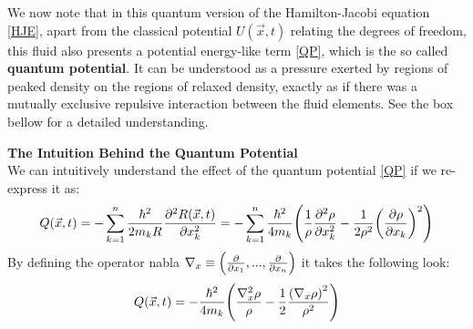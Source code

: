 \documentclass[11pt, a4paper]{article} %
\DeclareRobustCommand{\mybox}[2][gray!10]{%
\begin{tcolorbox}[   %
        left=0.2cm,
        right=0.2cm,
        top=0.15cm,
        bottom=0.15cm,
        colback=#1,
        colframe=#1,
        width=\dimexpr\textwidth\relax, 
        enlarge left by=0mm,
        boxsep=5pt,
        arc=0pt,outer arc=0pt,
        ]
        #2
\end{tcolorbox}
}
\begin{document}
We now note that in this quantum version of the Hamilton-Jacobi equation \eqref{HJE}, apart from the classical potential $U(\vec{x},t)$ relating the degrees of freedom, this fluid also presents a potential energy-like term \eqref{QP}, which is the so called {\bf quantum potential}. It can be understood as a pressure exerted by regions of peaked density on the regions of relaxed density, exactly as if there was a mutually exclusive repulsive interaction between the fluid elements. See the box bellow for a detailed understanding.
\vspace{+0.3cm}

\mybox{
{\bf The Intuition Behind the Quantum Potential\vspace{0.2cm}\\}
We can intuitively understand the effect of the quantum potential \eqref{QP} if we re-express it as:
$$
Q(\vec{x},t) = -\sum_{k=1}^n \frac{\hbar^2}{2m_k R}\pdv[2]{R(\vec{x}, t)}{x_k} =  -\sum_{k=1}^n \frac{\hbar^2}{4m_k} \qty(\frac{1}{\rho}\pdv[2]{\rho}{x_k} -\frac{1}{2\rho^2}\qty(\pdv{\rho}{x_k})^2)
$$
By defining the operator nabla $\nabla_x \equiv \qty(\pdv{}{x_1}, ... , \pdv{}{x_n})$ it takes the following look:
\begin{equation}\label{Q2}
Q(\vec{x},t) = -\frac{\hbar^2}{4m_k }\qty(\frac{\nabla_x^2\rho}{\rho} -\frac{1}{2}\frac{\qty(\nabla_x \rho)^2}{\rho^2})\vspace{-0.2cm}
\end{equation}
}
\end{document}
